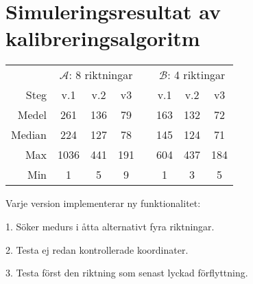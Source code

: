 \section{Simuleringsresultat av kalibreringsalgoritm} %
\label{sec:sokalgoritm_sim}
    \begin{table}[ht]
        \centering
        \begin{threeparttable}
        \begin{tabular}{rccccccc}\toprule
            & \multicolumn{3}{c}{ $\mathscr{A}$: 8 riktningar} &  & \multicolumn{3}{c}{ $\mathscr{B}$: 4 riktingar} \\ %
            \hspace{5mm}    Steg    & v.1   & v.2   & v3    & \hspace{5mm}  & v.1   & v.2   & v3    \\  \midrule
                            Medel   & 261   & 136   & 79    &               & 163   & 132   & 72    \\
                            Median  & 224   & 127   & 78    &               & 145   & 124   & 71    \\
                            Max     & 1036  & 441   & 191   &               & 604   & 437   & 184   \\
                            Min     & 1     & 5     & 9     &               & 1     & 3     & 5     \\  \bottomrule
        \end{tabular}
        \begin{tablenotes}[flushleft]
            \item  Varje version implementerar ny funktionalitet:
            \item 1. Söker medurs i åtta alternativt fyra riktningar.
            \item 2. Testa ej redan kontrollerade koordinater.
            \item 3. Testa först den riktning som senast lyckad förflyttning.
        \end{tablenotes}
        \end{threeparttable}
    \end{table} \bigskip
